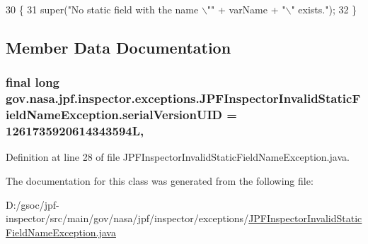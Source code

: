 \begin{DoxyCode}
30                                                                       \{
31     super(\textcolor{stringliteral}{"No static field with the name \(\backslash\)""} + varName + \textcolor{stringliteral}{"\(\backslash\)" exists."});
32   \}
\end{DoxyCode}


\subsection{Member Data Documentation}
\subsubsection[{\texorpdfstring{serial\+Version\+U\+ID}{serialVersionUID}}]{\setlength{\rightskip}{0pt plus 5cm}final long gov.\+nasa.\+jpf.\+inspector.\+exceptions.\+J\+P\+F\+Inspector\+Invalid\+Static\+Field\+Name\+Exception.\+serial\+Version\+U\+ID = 1261735920614343594L\hspace{0.3cm}{\ttfamily [static]}, {\ttfamily [private]}}\hypertarget{classgov_1_1nasa_1_1jpf_1_1inspector_1_1exceptions_1_1_j_p_f_inspector_invalid_static_field_name_exception_ad91ad06e3e42058db569ad749e53394a}{}\label{classgov_1_1nasa_1_1jpf_1_1inspector_1_1exceptions_1_1_j_p_f_inspector_invalid_static_field_name_exception_ad91ad06e3e42058db569ad749e53394a}


Definition at line 28 of file J\+P\+F\+Inspector\+Invalid\+Static\+Field\+Name\+Exception.\+java.



The documentation for this class was generated from the following file\+:\begin{DoxyCompactItemize}
\item 
D\+:/gsoc/jpf-\/inspector/src/main/gov/nasa/jpf/inspector/exceptions/\hyperlink{_j_p_f_inspector_invalid_static_field_name_exception_8java}{J\+P\+F\+Inspector\+Invalid\+Static\+Field\+Name\+Exception.\+java}\end{DoxyCompactItemize}
